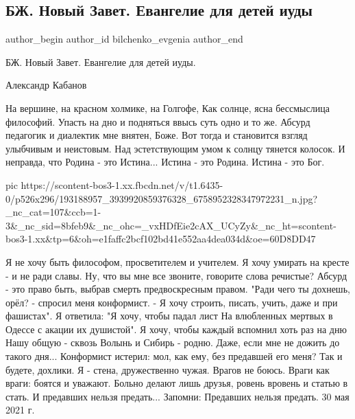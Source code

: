  
 
 
 
 
 
\subsection{БЖ. Новый Завет. Евангелие для детей иуды}
\label{sec:30_05_2021.fb.bilchenko_evgenia.1.evangelie_deti_iudy}
\ifcmt
 author_begin
   author_id bilchenko_evgenia
 author_end
\fi

БЖ. Новый Завет.  Евангелие для детей иуды.

Александр Кабанов 

На вершине, на красном холмике, на Голгофе,
Как солнце, ясна бессмыслица философий.
Упасть на дно и подняться ввысь суть одно и то же.
Абсурд педагогик и диалектик мне внятен, Боже.
Вот тогда и становится взгляд улыбчивым и неистовым.
Над эстетствующим умом к солнцу тянется колосок.
И неправда, что Родина - это Истина...
Истина - это Родина. 
Истина - это Бог.

\ifcmt
  pic https://scontent-bos3-1.xx.fbcdn.net/v/t1.6435-0/p526x296/193188957_3939920859376328_6758952328347972231_n.jpg?_nc_cat=107&ccb=1-3&_nc_sid=8bfeb9&_nc_ohc=_vxHDfEie2cAX_UCyZy&_nc_ht=scontent-bos3-1.xx&tp=6&oh=e1faffc2bcf102bd41e552aa4dea034d&oe=60D8DD47
\fi

Я не хочу быть философом, просветителем и учителем.
Я хочу умирать на кресте - и не ради славы.
Ну, что вы мне все звоните, говорите слова речистые?
Абсурд - это право быть, выбрав смерть предвоскресным правом.
"Ради чего ты дохнешь, орёл? - спросил меня конформист. -
Я хочу строить, писать, учить, даже и при фашистах".
Я ответила: "Я хочу, чтобы падал лист
На влюбленных мертвых в Одессе с акации их душистой".
Я хочу, чтобы каждый вспомнил хоть раз на дню
Нашу общую - сквозь Волынь и Сибирь - родню.
Даже, если мне не дожить до такого дня...
Конформист истерил: мол, как ему, без предавшей его меня?
Так и будете, дохлики. Я - стена, дружественно чужая.
Врагов не боюсь. Враги как враги: боятся и уважают.
Больно делают лишь друзья, ровень вровень и статью в стать.
И предавших нельзя предать...
Запомни: 
Предавших нельзя предать.
30 мая 2021 г.
